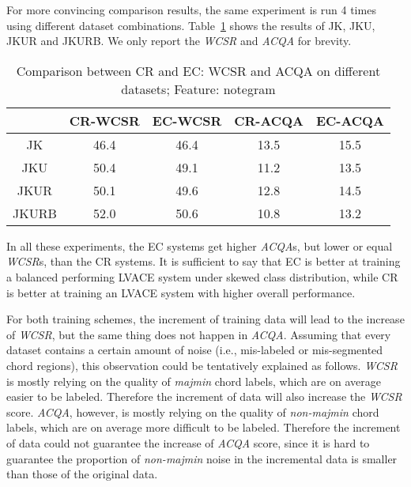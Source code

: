 For more convincing comparison results, the same experiment is run 4 times using different dataset combinations. Table~\ref{tab:4-datasize-ns} shows the results of JK, JKU, JKUR and JKURB. We only report the \textit{WCSR} and \textit{ACQA} for brevity.
\begin{table}[htb]
	\caption{Comparison between CR and EC: WCSR and ACQA on different datasets; Feature: notegram}
	\centering
	\scriptsize
	\begin{tabular}{|c|c|c|c|c|} \hline
		& CR-WCSR & EC-WCSR & CR-ACQA & EC-ACQA \\ \hline
		JK & 46.4 & 46.4 & 13.5 & 15.5 \\ \hline
		JKU & 50.4 & 49.1 & 11.2 & 13.5 \\ \hline
		JKUR & 50.1 & 49.6 & 12.8 & 14.5 \\ \hline
		JKURB & 52.0 & 50.6 & 10.8 & 13.2 \\ \hline
	\end{tabular}
	\label{tab:4-datasize-ns}
\end{table}

In all these experiments, the EC systems get higher \textit{ACQA}s, but lower or equal \textit{WCSR}s, than the CR systems. It is sufficient to say that EC is better at training a balanced performing LVACE system under skewed class distribution, while CR is better at training an LVACE system with higher overall performance.

For both training schemes, the increment of training data will lead to the increase of \textit{WCSR}, but the same thing does not happen in \textit{ACQA}. Assuming that every dataset contains a certain amount of noise (i.e., mis-labeled or mis-segmented chord regions), this observation could be tentatively explained as follows. \textit{WCSR} is mostly relying on the quality of \textit{majmin} chord labels, which are on average easier to be labeled. Therefore the increment of data will also increase the \textit{WCSR} score. \textit{ACQA}, however, is mostly relying on the quality of \textit{non-majmin} chord labels, which are on average more difficult to be labeled. Therefore the increment of data could not guarantee the increase of \textit{ACQA} score, since it is hard to guarantee the proportion of \textit{non-majmin} noise in the incremental data is smaller than those of the original data.

